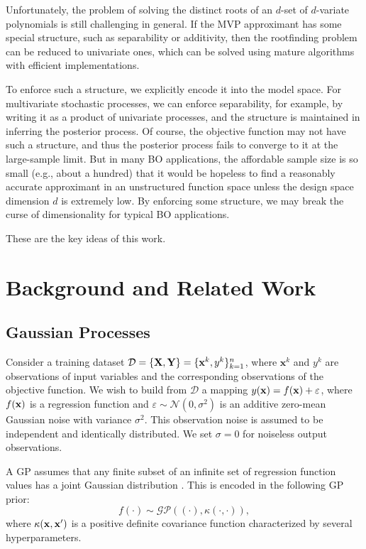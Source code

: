 \documentclass{article}
\begin{document}
Unfortunately, the problem of solving the distinct roots of an $d$-set
of $d$-variate polynomials is still challenging in general. If the MVP
approximant has some special structure, such as separability or
additivity, then the rootfinding problem can be reduced to univariate
ones, which can be solved using mature algorithms with efficient
implementations.

To enforce such a structure, we explicitly encode it into the model
space. For multivariate stochastic processes, we can enforce
separability, for example, by writing it as a product of univariate
processes, and the structure is maintained in inferring the posterior
process. Of course, the objective function may not have such a
structure, and thus the posterior process fails to converge to it at the
large-sample limit. But in many BO applications, the affordable sample
size is so small (e.g., about a hundred) that it would be hopeless to
find a reasonably accurate approximant in an unstructured function space
unless the design space dimension $d$ is extremely low. By enforcing
some structure, we may break the curse of dimensionality for typical BO
applications.

These are the key ideas of this work.

\section{Background and Related Work}

\subsection{Gaussian Processes}

Consider a training dataset $\mathcal{D}=\left\{ {\bf X},{\bf Y}\right\}=\{{\bf x}^k,y^k\}_{k=1}^n$, where $\textbf{x}^k$ and $y^k$ are observations of input variables and the corresponding observations of the objective function.
We wish to build from $\mathcal{D}$ a mapping $y({\bf x})=f({\bf x}) + \varepsilon$, where $f({\bf x})$ is a regression function and $\varepsilon \sim \mathcal{N}(0,\sigma^2)$  is an additive zero-mean Gaussian noise with variance $\sigma^2$.
This observation noise is assumed to be independent and identically distributed. We set $\sigma = 0$ for noiseless output observations.

A GP assumes that any finite subset of an infinite set of regression function values has a joint Gaussian distribution \cite{Rasmussen2006}.
This is encoded in the following GP prior:
%
\begin{equation}\label{eqn1}
	f(\cdot) \sim \mathcal{GP} \left((\cdot),\kappa(\cdot,\cdot)\right),
\end{equation}
where $\kappa({\bf x},{\bf x}')$ is a positive definite covariance function characterized by several hyperparameters.
\end{document}
